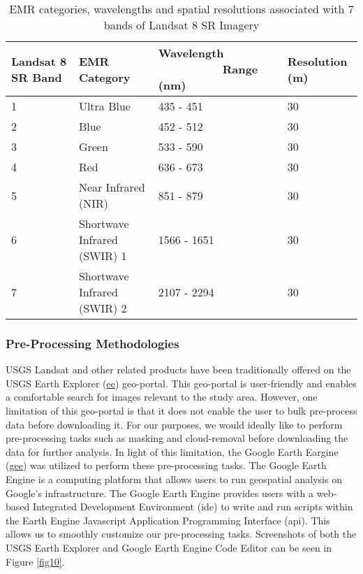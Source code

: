 \begin{table}[H]
	\centering
	\small
	\def\arraystretch{1.3}
	\begin{threeparttable}
		\caption{EMR categories, wavelengths and spatial resolutions associated with 7 bands of Landsat 8 SR Imagery \citep{rs61010232}}
		\label{tableL8SR}
		\begin{tabular}{L{2.5cm} L{5.5cm} L{3.8cm} L{2.5cm}}
			\toprule[0.25mm]
			Landsat 8 SR Band & EMR Category & Wavelength ~~~~~~~~~~Range (nm) & Resolution (m)\\
			   & Ultra Blue & 435 - 451 & 30\\
			2   & Blue & 452 - 512 & 30\\
			3   & Green & 533 - 590& 30 \\
			4   & Red & 636 - 673 & 30\\
			5   & Near Infrared (NIR) & 851 - 879 & 30\\
			6   & Shortwave Infrared (SWIR) 1 & 1566 - 1651 & 30\\
			7   &  Shortwave Infrared (SWIR) 2 & 2107 - 2294 & 30\\
			\bottomrule[0.25mm]
		\end{tabular}
	\end{threeparttable}
\end{table}

\subsubsection{Pre-Processing Methodologies}

\justify
USGS Landsat and other related products have been traditionally offered on the USGS Earth Explorer (\href{https://earthexplorer.usgs.gov/}{\ac{ee}}) geo-portal. This geo-portal is user-friendly and enables a comfortable search for images relevant to the study area. However, one limitation of this geo-portal is that it does not enable the user to bulk pre-process data before downloading it. For our purposes, we would ideally like to perform pre-processing tasks such as masking and cloud-removal before downloading the data for further analysis. In light of this limitation, the Google Earth Eargine (\href{https://earthengine.google.com/}{\ac{gee}}) was utilized to perform these pre-processing tasks. The Google Earth Engine is a computing platform that allows users to run geospatial analysis on Google's infrastructure. The Google Earth Engine provides users with a web-based Integrated Development Environment (\ac{ide}) to write and run scripts within the Earth Engine Javascript Application Programming Interface (\ac{api}). This allows us to smoothly customize our pre-processing tasks. Screenshots of both the USGS Earth Explorer and Google Earth Engine Code Editor can be seen in Figure \ref{fig10}.

